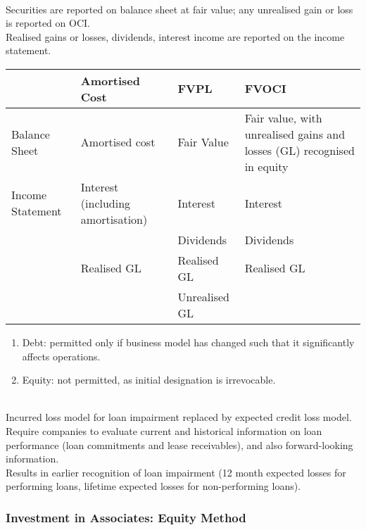\begin{method} \\
Securities are reported on balance sheet at fair value; any unrealised gain or loss is reported on OCI.\\
Realised gains or losses, dividends, interest income are reported on the income statement.
\end{method}

\begin{tabularx}{\textwidth}{p{5em}|p{14.5em}|X|p{16em}}
\hline
\rowcolor{gray!30}
 & Amortised Cost & FVPL & FVOCI \\
\hline
Balance Sheet & Amortised cost & Fair Value & Fair value, with unrealised gains and losses (GL) recognised in equity \\
\hline
Income Statement & Interest (including amortisation) & Interest & Interest \\
& & Dividends & Dividends \\
& Realised GL & Realised GL & Realised GL \\
& & Unrealised GL & \\
\hline
\end{tabularx}

\begin{method} 
\begin{enumerate}[label=\roman*.]
\setlength{\itemsep}{0pt}
\item Debt: permitted only if business model has changed such that it significantly affects operations.
\item Equity: not permitted, as initial designation is irrevocable.
\end{enumerate}
\end{method}

\begin{method} \\
Incurred loss model for loan impairment replaced by expected credit loss model. Require companies to evaluate current and historical information on loan performance (loan commitments and lease receivables), and also forward-looking information.\\
Results in earlier recognition of loan impairment (12 month expected losses for performing loans, lifetime expected losses for non-performing loans).
\end{method}

\subsubsection{Investment in Associates: Equity Method}

